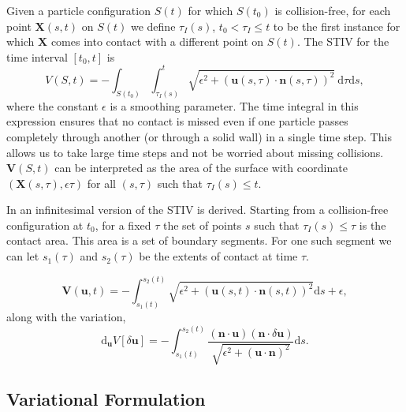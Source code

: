 \documentclass[preprint, 10pt]{elsarticle}
\begin{document}
Given a particle configuration $S(t)$ for which $S(t_0)$ is collision-free, for each point $\mathbf{X}(s,t)$ on $S(t)$ we define $\tau_I(s)$, $t_0 < \tau_I \leq t$ to be the first instance for which $\mathbf{X}$ comes into contact with a different point on $S(t)$. The STIV for the time interval $[t_0, t]$ is 
\[ V(S, t) = -\int_{S(t_0)}\int_{\tau_I(s)}^t \sqrt{\epsilon^2 + (\mathbf{u}(s, \tau)\cdot\mathbf{n}(s,\tau))^2}~\text{d}\tau\text{d}s,\]
where the constant $\epsilon$ is a smoothing parameter. The time integral in this expression ensures that no contact is missed even if one particle passes completely through another (or through a solid wall) in a single time step. This allows us to take large time steps and not be worried about missing collisions. $\mathbf{V}(S,t)$ can be interpreted as the area of the surface with coordinate $(\mathbf{X}(s,\tau),\epsilon\tau)$ for all $(s,\tau)$ such that $\tau_I(s)\leq t$. 

In \cite{Lu2017} an infinitesimal version of the STIV is derived. Starting from a collision-free configuration at $t_0$, for a fixed $\tau$ the set of points $s$ such that $\tau_I(s)\leq \tau$ is the contact area. This area is a set of boundary segments. For one such segment we can let $s_1(\tau)$ and $s_2(\tau)$ be the extents of contact at time $\tau$. 

\[ \mathbf{V}(\mathbf{u},t) = -\int_{s_1(t)}^{s_2(t)} \sqrt{\epsilon^2 + (\mathbf{u}(s,t)\cdot\mathbf{n}(s,t))^2}\text{d}s + \epsilon,\]
along with the variation, 
\[ \text{d}_{\mathbf{u}}V[\delta\mathbf{u}] = -\int_{s_1(t)}^{s_2(t)}\frac{(\mathbf{n}\cdot\mathbf{u})(\mathbf{n}\cdot\delta\mathbf{u})}{\sqrt{\epsilon^2 + (\mathbf{u}\cdot\mathbf{n})^2}}\text{d}s.\]




\subsection{Variational Formulation}
\end{document}
